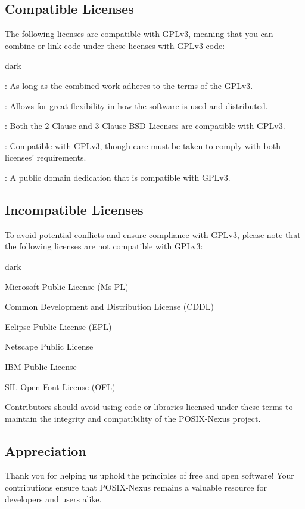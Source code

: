 \subsection{Compatible Licenses}
\label{sec:license:sub:compatable}
The following licenses are compatible with GPLv3, meaning that you can combine or link code under these licenses with GPLv3 code:
\bigskip
\begin{baseBoxOne}{}{dark}
    \begin{posnexItemize}
        \item[\sA] : As long as the combined work adheres to the terms of the GPLv3.
        \item[\sA] : Allows for great flexibility in how the software is used and distributed.
        \item[\sA] : Both the 2-Clause and 3-Clause BSD Licenses are compatible with GPLv3.
        \item[\sA] : Compatible with GPLv3, though care must be taken to comply with both licenses' requirements.
        \item[\sA] : A public domain dedication that is compatible with GPLv3.
    \end{posnexItemize}
\end{baseBoxOne}

\subsection{Incompatible Licenses}
\label{sec:license:sub:incompatible}
To avoid potential conflicts and ensure compliance with GPLv3, please note that the following licenses are not compatible with GPLv3:
\bigskip
\begin{baseBoxOne}{}{dark}
    \begin{posnexItemize}
        \item[\sA] Microsoft Public License (Ms-PL)
        \item[\sA] Common Development and Distribution License (CDDL)
        \item[\sA] Eclipse Public License (EPL)
        \item[\sA] Netscape Public License
        \item[\sA] IBM Public License
        \item[\sA] SIL Open Font License (OFL)
    \end{posnexItemize}
\end{baseBoxOne}
\bigskip
Contributors should avoid using code or libraries licensed under these terms to maintain the integrity and compatibility of the POSIX-Nexus project.

\label{sec:license:sub:appreciation}
\subsection{Appreciation}
Thank you for helping us uphold the principles of free and open software! Your contributions ensure that POSIX-Nexus remains a valuable resource for developers and users alike.
